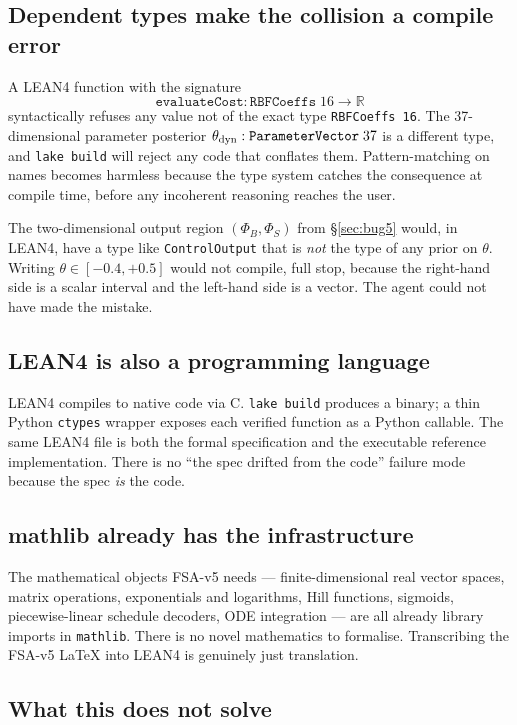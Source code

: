 \documentclass[11pt,a4paper]{article}
\begin{document}
\subsection{Dependent types make the collision a compile error}

A LEAN4 function with the signature
\[
\texttt{evaluateCost} : \texttt{RBFCoeffs}\;16 \to \mathbb{R}
\]
syntactically refuses any value not of the exact type
\texttt{RBFCoeffs 16}. The 37-dimensional parameter posterior
$\theta_{\rm dyn} : \texttt{ParameterVector}\;37$ is a different
type, and \texttt{lake build} will reject any code that conflates
them. Pattern-matching on names becomes harmless because the type
system catches the consequence at compile time, before any
incoherent reasoning reaches the user.

The two-dimensional output region $(\Phi_B, \Phi_S)$ from
§\ref{sec:bug5} would, in LEAN4, have a type like
\texttt{ControlOutput} that is \emph{not} the type of any prior on
$\theta$. Writing $\theta \in [-0.4, +0.5]$ would not compile, full
stop, because the right-hand side is a scalar interval and the
left-hand side is a vector. The agent could not have made the
mistake.

\subsection{LEAN4 is also a programming language}

LEAN4 compiles to native code via C. \texttt{lake build} produces
a binary; a thin Python \texttt{ctypes} wrapper exposes each
verified function as a Python callable. The same LEAN4 file is
both the formal specification and the executable reference
implementation. There is no ``the spec drifted from the code''
failure mode because the spec \emph{is} the code.

\subsection{mathlib already has the infrastructure}

The mathematical objects FSA-v5 needs ---
finite-dimensional real vector spaces, matrix operations,
exponentials and logarithms, Hill functions, sigmoids,
piecewise-linear schedule decoders, ODE integration --- are all
already library imports in \texttt{mathlib}. There is no novel
mathematics to formalise. Transcribing the FSA-v5 LaTeX into LEAN4
is genuinely just translation.

\subsection{What this does not solve}
\end{document}
